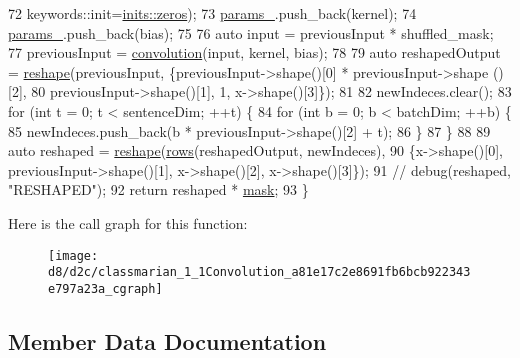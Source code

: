 \begin{DoxyCode}
72                                  keywords::init=\hyperlink{namespacemarian_1_1inits_a1bd34fd256e3df7bb1e27955a7f2b359}{inits::zeros});
73       \hyperlink{classmarian_1_1Convolution_a6a56e7a677386b591a1622732f53ae9a}{params\_}.push\_back(kernel);
74       \hyperlink{classmarian_1_1Convolution_a6a56e7a677386b591a1622732f53ae9a}{params\_}.push\_back(bias);
75 
76       \textcolor{keyword}{auto} input = previousInput * shuffled\_mask;
77       previousInput = \hyperlink{namespacemarian_a3dbe8b5eb203876cd08cf3fe75a1c6bc}{convolution}(input, kernel, bias);
78 
79       \textcolor{keyword}{auto} reshapedOutput = \hyperlink{namespacemarian_acd984f43188d0ae23c2a6ef13ae5293f}{reshape}(previousInput, \{previousInput->shape()[0] * previousInput->shape
      ()[2],
80                                                     previousInput->shape()[1], 1, x->shape()[3]\});
81 
82       newIndeces.clear();
83       \textcolor{keywordflow}{for} (\textcolor{keywordtype}{int} t = 0; t < sentenceDim; ++t) \{
84         \textcolor{keywordflow}{for} (\textcolor{keywordtype}{int} b = 0; b < batchDim; ++b) \{
85           newIndeces.push\_back(b * previousInput->shape()[2] + t);
86         \}
87       \}
88 
89       \textcolor{keyword}{auto} reshaped = \hyperlink{namespacemarian_acd984f43188d0ae23c2a6ef13ae5293f}{reshape}(\hyperlink{namespacemarian_ace1e9a63d52edc363d70d661cf8d0257}{rows}(reshapedOutput, newIndeces),
90                          \{x->shape()[0], previousInput->shape()[1], x->shape()[2], x->shape()[3]\});
91       \textcolor{comment}{// debug(reshaped, "RESHAPED");}
92       \textcolor{keywordflow}{return} reshaped * \hyperlink{namespacemarian_1_1keywords_a201bea6bea8108889b63081132cc3cd7}{mask};
93     \}
\end{DoxyCode}


Here is the call graph for this function\+:
\nopagebreak
\begin{figure}[H]
\begin{center}
\leavevmode
\texttt{[image: d8/d2c/classmarian\_1\_1Convolution\_a81e17c2e8691fb6bcb922343e797a23a\_cgraph]}
\end{center}
\end{figure}




\subsection{Member Data Documentation}
